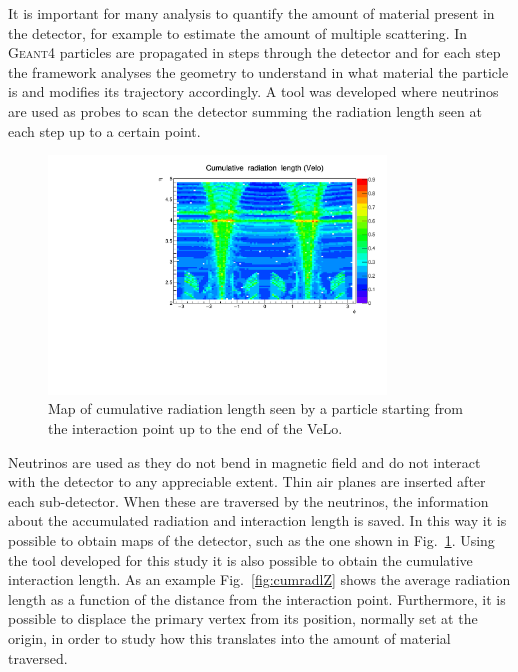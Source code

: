 It is important for many analysis to quantify the amount of material present in the detector, for example to estimate
the amount of multiple scattering. In \textsc{Geant4} particles are propagated in steps
through the detector and for each step the framework analyses the geometry to understand in what material
the particle is and modifies its trajectory accordingly. A tool was developed where neutrinos are
used as probes to scan the detector summing the radiation length seen at each step up to a certain point.
%
\begin{figure}[b]
\centering \includegraphics[width=0.8\textwidth]{Detector/figs/validation/radlenght/radlgh_prof_ID1.pdf}
\caption{Map of cumulative radiation length seen by a particle starting from
the interaction point up to the end of the VeLo.}
\label{fig:radlmap}
\end{figure}
%
Neutrinos are used as they do not bend in magnetic field and do not interact with the detector to any appreciable extent.
Thin air planes are inserted after each sub-detector. When these are traversed by the neutrinos, the information
about the accumulated radiation and interaction length is saved. In this way it is possible to obtain maps of
the detector, such as the one shown in Fig.~\ref{fig:radlmap}. Using the tool developed for this study
it is also possible to obtain the cumulative interaction length. 
As an example Fig.~\ref{fig:cumradlZ} shows the average
radiation length as a function of the distance from the interaction point. Furthermore, it is possible to displace 
the primary vertex from its position, normally set at the origin, in order to study how this translates 
into the amount of material traversed. 

